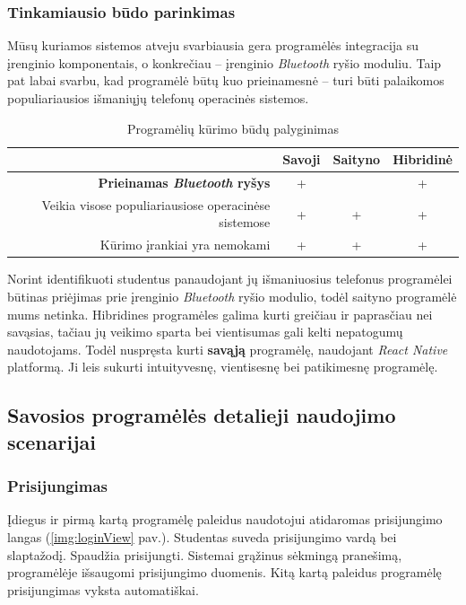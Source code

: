 \documentclass{VUMIFPSbakalaurinis}
\begin{document}
\subsubsection{Tinkamiausio būdo parinkimas}

Mūsų kuriamos sistemos atveju svarbiausia gera programėlės integracija su įrenginio komponentais, o konkrečiau – įrenginio \textit{Bluetooth} ryšio moduliu. Taip pat labai svarbu, kad programėlė būtų kuo prieinamesnė – turi būti palaikomos populiariausios išmaniųjų telefonų operacinės sistemos.

\begin{table}[H]
	\centering
	\begin{tabular}{ | r | c | c | c | }
		\hline
		& Savoji & Saityno & Hibridinė \\
		\hline
		\textbf{Prieinamas \textit{Bluetooth} ryšys} & + &  & + \\
		\hline
		Veikia visose populiariausiose operacinėse sistemose & + & + & + \\
		\hline
		Kūrimo įrankiai yra nemokami & + & + & + \\
		\hline
	\end{tabular}
	\caption{Programėlių kūrimo būdų palyginimas}
	\label{appCompare}
\end{table}

Norint identifikuoti studentus panaudojant jų išmaniuosius telefonus programėlei būtinas priėjimas prie įrenginio \textit{Bluetooth} ryšio modulio, todėl saityno programėlė mums netinka. Hibridines programėles galima kurti greičiau ir paprasčiau nei savąsias, tačiau jų veikimo sparta bei vientisumas gali kelti nepatogumų naudotojams. Todėl nuspręsta kurti \textbf{savąją} programėlę, naudojant \textit{React Native} platformą. Ji leis sukurti intuityvesnę, vientisesnę bei patikimesnę programėlę.

\subsection{Savosios programėlės detalieji naudojimo scenarijai}

\subsubsection{Prisijungimas}

Įdiegus ir pirmą kartą programėlę paleidus naudotojui atidaromas prisijungimo langas (\ref{img:loginView} pav.). Studentas suveda prisijungimo vardą bei slaptažodį. Spaudžia prisijungti. Sistemai grąžinus sėkmingą pranešimą, programėlėje išsaugomi prisijungimo duomenis. Kitą kartą paleidus programėlę prisijungimas vyksta automatiškai.
\end{document}
